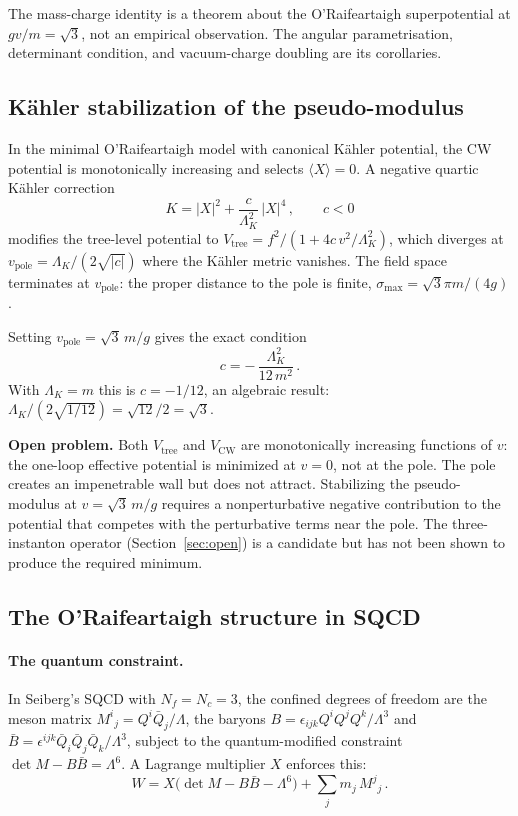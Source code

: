 \documentclass[12pt,a4paper]{article}
\begin{document}
\medskip
The mass-charge identity is a theorem about the O'Raifeartaigh superpotential at
$gv/m = \sqrt{3}$, not an empirical observation.  The angular parametrisation,
determinant condition, and vacuum-charge doubling are its corollaries.

\subsection{K\"ahler stabilization of the pseudo-modulus}

In the minimal O'Raifeartaigh model with canonical K\"ahler potential,
the CW potential is monotonically increasing and selects
$\langle X\rangle = 0$.  A negative quartic K\"ahler correction
\begin{equation}
  K = |X|^2 + \frac{c}{\Lambda_K^2}\,|X|^4\,,
  \qquad c < 0
\end{equation}
modifies the tree-level potential to
$V_{\text{tree}} = f^2/(1 + 4c\,v^2/\Lambda_K^2)$, which
diverges at $v_{\text{pole}} = \Lambda_K/(2\sqrt{|c|})$
where the K\"ahler metric vanishes.  The field space terminates
at $v_{\text{pole}}$: the proper distance to the pole is finite,
$\sigma_{\max} = \sqrt{3}\pi m/(4g)$.

Setting $v_{\text{pole}} = \sqrt{3}\,m/g$ gives the exact condition
\begin{equation}
  c = -\,\frac{\Lambda_K^2}{12\,m^2}\,.
\end{equation}
With $\Lambda_K = m$ this is $c = -1/12$, an algebraic result:
$\Lambda_K/(2\sqrt{1/12}) = \sqrt{12}/2 = \sqrt{3}$.

\textbf{Open problem.} Both $V_{\text{tree}}$ and $V_{\text{CW}}$
are monotonically increasing functions of $v$: the one-loop
effective potential is minimized at $v = 0$, not at the pole.
The pole creates an impenetrable wall but does not attract.
Stabilizing the pseudo-modulus at $v = \sqrt{3}\,m/g$ requires
a nonperturbative negative contribution to the potential that
competes with the perturbative terms near the pole. The
three-instanton operator (Section~\ref{sec:open}) is a
candidate but has not been shown to produce the required
minimum.

\subsection{The O'Raifeartaigh structure in SQCD}

\paragraph{The quantum constraint.}
In Seiberg's SQCD with $N_f = N_c = 3$, the confined degrees of freedom
are the meson matrix $M^i{}_j = Q^i\bar Q_j/\Lambda$, the baryons
$B = \epsilon_{ijk}Q^iQ^jQ^k/\Lambda^3$ and
$\bar B = \epsilon^{ijk}\bar Q_i\bar Q_j\bar Q_k/\Lambda^3$,
subject to the quantum-modified constraint
$\det M - B\bar B = \Lambda^6$.
A Lagrange multiplier $X$ enforces this:
\begin{equation}
  W = X\bigl(\det M - B\bar B - \Lambda^6\bigr) + \sum_j m_j\, M^j{}_j\,.
\end{equation}
\end{document}
